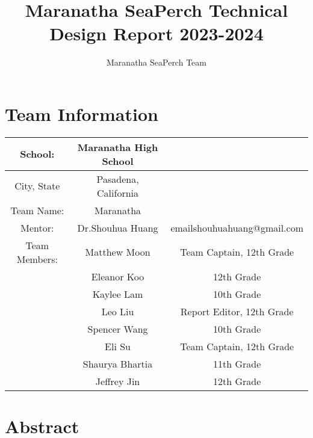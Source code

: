 \documentclass[11pt, oneside]{article}   	%
\title{Maranatha SeaPerch Technical Design Report 2023-2024}
\author{Maranatha SeaPerch Team}
\begin{document}
\maketitle

\pagebreak

\section*{Team Information}
\begin{center}
	\begin{tabular}{|c|c|c|}
		\hline
		School: & Maranatha High School & \\
		\hline
		City, State & Pasadena, California & \\
		\hline
		Team Name: & Maranatha & \\
		\hline
		Mentor: & Dr.Shouhua Huang & emailshouhuahuang@gmail.com \\
		\hline
		\hline
		Team Members: & Matthew Moon & Team Captain, 12th Grade \\
		\hline
		& Eleanor Koo & 12th Grade\\
		\hline
		& Kaylee Lam & 10th Grade\\
		\hline
		& Leo Liu & Report Editor, 12th Grade\\
		\hline
		& Spencer Wang & 10th Grade\\
		\hline
		\hline
		& Eli Su & Team Captain, 12th Grade\\
		\hline
		& Shaurya Bhartia & 11th Grade\\
		\hline
		& Jeffrey Jin & 12th Grade\\
		\hline


	\end{tabular}
\end{center}

\pagebreak

\section{Abstract}
\end{document}
